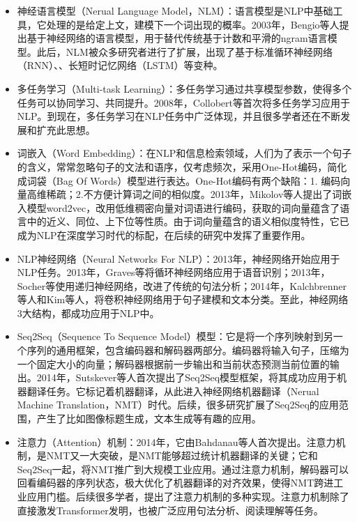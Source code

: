 \begin{enumerate}
\begin{itemize}
    \item 神经语言模型（Nerual Language Model，NLM）：语言模型是NLP中基础工具，它处理的是给定上文，建模下一个词出现的概率。2003年，Bengio等人提出基于神经网络的语言模型\cite{bengio2003neural}，用于替代传统基于计数和平滑的ngram语言模型。此后，NLM被众多研究者进行了扩展，出现了基于标准循环神经网络（RNN）、\cite{mikolov2010recurrent}、长短时记忆网络（LSTM）\cite{graves2013generating}等变种。
    \item 多任务学习（Multi-task Learning）：多任务学习通过共享模型参数，使得多个任务可以协同学习、共同提升。2008年，Collobert等首次将多任务学习\cite{collobert2008unified}应用于NLP。到现在，多任务学习在NLP任务中广泛体现，并且很多学者还在不断发展和扩充此思想。
    \item 词嵌入（Word Embedding）：在NLP和信息检索领域，人们为了表示一个句子的含义，常常忽略句子的文法和语序，仅考虑频次，采用One-Hot编码，简化成词袋（Bag Of Words）模型进行表达。One-Hot编码有两个缺陷：1. 编码向量高维稀疏；2.不方便计算词之间的相似度。2013年，Mikolov等人提出了词嵌入模型word2vec\cite{mikolov2013efficient}，改用低维稠密向量对词语进行编码，获取的词向量蕴含了语言中的近义、同位、上下位等性质。由于词向量蕴含的语义相似度特性，它已成为NLP在深度学习时代的标配，在后续的研究中发挥了重要作用。
    \item NLP神经网络（Neural Networks For NLP）：2013年，神经网络开始应用于NLP任务。2013年，Graves等将循环神经网络\cite{graves2013hybrid}应用于语音识别；2013年，Socher等使用递归神经网络\cite{socher2013recursive}，改进了传统的句法分析；2014年，Kalchbrenner\cite{kalchbrenner2014convolutional}等人和Kim\cite{kim2014convolutional}等人，将卷积神经网络用于句子建模和文本分类。至此，神经网络3大结构，都成功应用于NLP中。
    \item Seq2Seq（Sequence To Sequence Model）模型：它是将一个序列映射到另一个序列的通用框架，包含编码器和解码器两部分。编码器将输入句子，压缩为一个固定大小的向量；解码器根据前一步输出和当前状态预测当前位置的输出。2014年，Sutskever等人首次提出了Seq2Seq\cite{sutskever2014sequence}模型框架，将其成功应用于机器翻译任务。它标记着机器翻译，从此进入神经网络机器翻译（Nerual Machine Translation，NMT）时代。后续，很多研究扩展了Seq2Seq的应用范围，产生了比如图像标题生成，文本生成等有趣的应用。
    \item 注意力（Attention）机制：2014年，它由Bahdanau\cite{bahdanau2014neural}等人首次提出。注意力机制，是NMT又一大突破，是NMT能够超过统计机器翻译的关键；它和Seq2Seq一起，将NMT推广到大规模工业应用。通过注意力机制，解码器可以回看编码器的序列状态，极大优化了机器翻译的对齐效果，使得NMT跨进工业应用门槛。后续很多学者，提出了注意力机制的多种实现。注意力机制除了直接激发Transformer\cite{vaswani2017attention}发明，也被广泛应用句法分析\cite{vinyals2015grammar}、阅读理解\cite{hermann2015teaching}等任务。

\end{itemize}
\end{enumerate}
